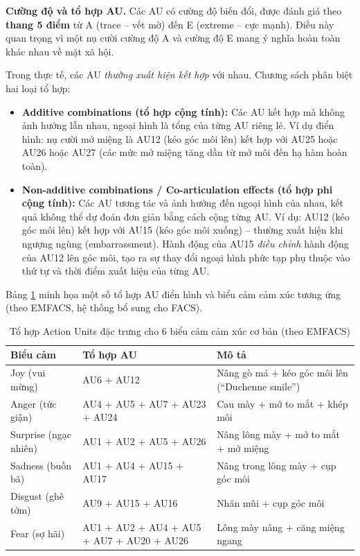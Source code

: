 \documentclass[12pt,a4paper]{article}
\let\oldtextbf\textbf
\renewcommand{\textbf}[1]{\oldtextbf{\textcolor{hcmublue}{#1}}}
\begin{document}
\textbf{Cường độ và tổ hợp AU.}
Các AU có cường độ biến đổi, được đánh giá theo \textbf{thang 5 điểm} từ A (trace -- vết mờ) đến E (extreme -- cực mạnh). Điều này quan trọng vì một nụ cười cường độ A và cường độ E mang ý nghĩa hoàn toàn khác nhau về mặt xã hội.

Trong thực tế, các AU \textit{thường xuất hiện kết hợp} với nhau. Chương sách phân biệt hai loại tổ hợp:

\begin{itemize}
    \item \textbf{Additive combinations (tổ hợp cộng tính):} Các AU kết hợp mà không ảnh hưởng lẫn nhau, ngoại hình là tổng của từng AU riêng lẻ. Ví dụ điển hình: nụ cười mở miệng là AU12 (kéo góc môi lên) kết hợp với AU25 hoặc AU26 hoặc AU27 (các mức mở miệng tăng dần từ mở môi đến hạ hàm hoàn toàn).

    \item \textbf{Non-additive combinations / Co-articulation effects (tổ hợp phi cộng tính):} Các AU tương tác và ảnh hưởng đến ngoại hình của nhau, kết quả không thể dự đoán đơn giản bằng cách cộng từng AU. Ví dụ: AU12 (kéo góc môi lên) kết hợp với AU15 (kéo góc môi xuống) -- thường xuất hiện khi ngượng ngùng (embarrassment). Hành động của AU15 \textit{điều chỉnh} hành động của AU12 lên góc môi, tạo ra sự thay đổi ngoại hình phức tạp phụ thuộc vào thứ tự và thời điểm xuất hiện của từng AU.
\end{itemize}

Bảng \ref{tab:au_combinations} minh họa một số tổ hợp AU điển hình và biểu cảm cảm xúc tương ứng (theo EMFACS, hệ thống bổ sung cho FACS).

\begin{table}[H]
\centering
\small
\begin{tabular}{|l|l|l|}
\hline
\textbf{Biểu cảm} & \textbf{Tổ hợp AU} & \textbf{Mô tả} \\ \hline
Joy (vui mừng)     & AU6 + AU12           & Nâng gò má + kéo góc môi lên (``Duchenne smile'') \\ \hline
Anger (tức giận)   & AU4 + AU5 + AU7 + AU23 + AU24 & Cau mày + mở to mắt + khép môi \\ \hline
Surprise (ngạc nhiên) & AU1 + AU2 + AU5 + AU26 & Nâng lông mày + mở to mắt + mở miệng \\ \hline
Sadness (buồn bã)  & AU1 + AU4 + AU15 + AU17 & Nâng trong lông mày + cụp góc môi \\ \hline
Disgust (ghê tởm)  & AU9 + AU15 + AU16 & Nhăn mũi + cụp góc môi \\ \hline
Fear (sợ hãi)      & AU1 + AU2 + AU4 + AU5 + AU7 + AU20 + AU26 & Lông mày nâng + căng miệng ngang \\ \hline
\end{tabular}
\caption{Tổ hợp Action Units đặc trưng cho 6 biểu cảm cảm xúc cơ bản (theo EMFACS)}
\label{tab:au_combinations}
\end{table}
\end{document}
